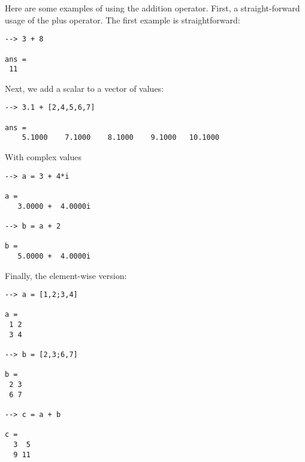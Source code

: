 Here are some examples of using the addition operator.  First, a 
straight-forward usage of the plus operator.  The first example
is straightforward:
\begin{verbatim}
--> 3 + 8

ans = 
 11 
\end{verbatim}
Next, we add a scalar to a vector of values:
\begin{verbatim}
--> 3.1 + [2,4,5,6,7]

ans = 
    5.1000    7.1000    8.1000    9.1000   10.1000 
\end{verbatim}
With complex values
\begin{verbatim}
--> a = 3 + 4*i

a = 
   3.0000 +  4.0000i 

--> b = a + 2

b = 
   5.0000 +  4.0000i 
\end{verbatim}
Finally, the element-wise version:
\begin{verbatim}
--> a = [1,2;3,4]

a = 
 1 2 
 3 4 

--> b = [2,3;6,7]

b = 
 2 3 
 6 7 

--> c = a + b

c = 
  3  5 
  9 11 
\end{verbatim}

